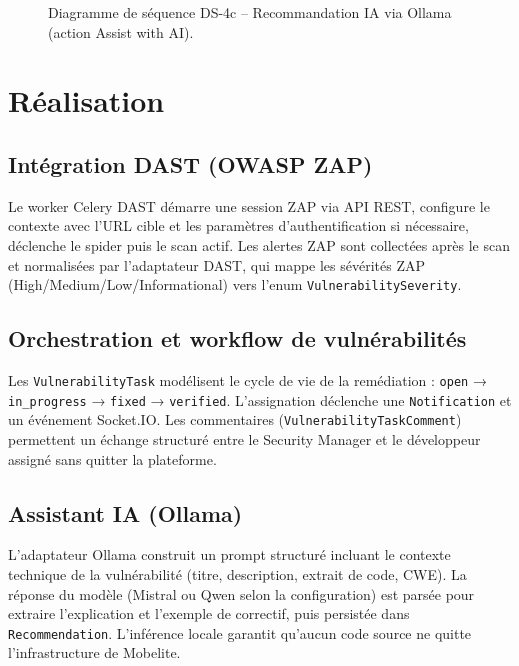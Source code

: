 \begin{figure}[H]
\centering
\fbox{\rule{0pt}{2in}\rule{0.9\linewidth}{0pt}}
\caption{Diagramme de séquence DS-4c -- Recommandation IA via Ollama (action Assist with AI).}
\label{fig:sprint4-seq-llm}
\end{figure}

\section{Réalisation}

\subsection{Intégration DAST (OWASP ZAP)}
Le worker Celery DAST démarre une session ZAP via API REST, configure le contexte avec l'URL cible et les paramètres d'authentification si nécessaire, déclenche le spider puis le scan actif. Les alertes ZAP sont collectées après le scan et normalisées par l'adaptateur DAST, qui mappe les sévérités ZAP (High/Medium/Low/Informational) vers l'enum \texttt{VulnerabilitySeverity}.

\subsection{Orchestration et workflow de vulnérabilités}
Les \texttt{VulnerabilityTask} modélisent le cycle de vie de la remédiation : \texttt{open} → \texttt{in\_progress} → \texttt{fixed} → \texttt{verified}. L'assignation déclenche une \texttt{Notification} et un événement Socket.IO. Les commentaires (\texttt{VulnerabilityTaskComment}) permettent un échange structuré entre le Security Manager et le développeur assigné sans quitter la plateforme.

\subsection{Assistant IA (Ollama)}
L'adaptateur Ollama construit un prompt structuré incluant le contexte technique de la vulnérabilité (titre, description, extrait de code, CWE). La réponse du modèle (Mistral ou Qwen selon la configuration) est parsée pour extraire l'explication et l'exemple de correctif, puis persistée dans \texttt{Recommendation}. L'inférence locale garantit qu'aucun code source ne quitte l'infrastructure de Mobelite.


